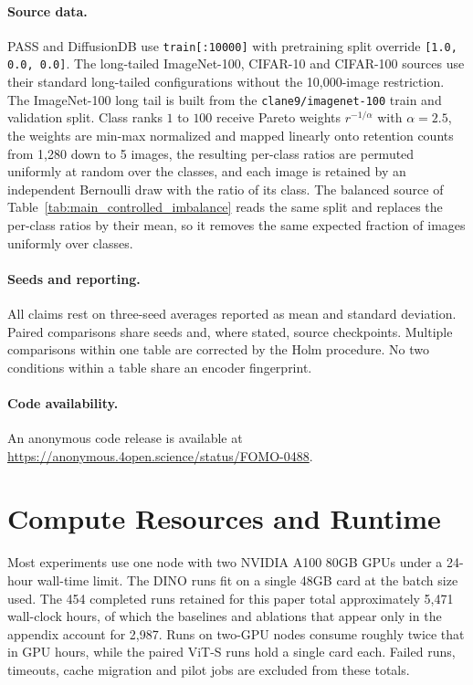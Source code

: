 \documentclass{article}
\begin{document}
\paragraph{Source data.}
PASS and DiffusionDB use \texttt{train[:10000]} with pretraining split override \texttt{[1.0, 0.0, 0.0]}. The long-tailed ImageNet-100, CIFAR-10 and CIFAR-100 sources use their standard long-tailed configurations without the 10{,}000-image restriction. The ImageNet-100 long tail is built from the \texttt{clane9/imagenet-100} train and validation split. Class ranks $1$ to $100$ receive Pareto weights $r^{-1/\alpha}$ with $\alpha=2.5$, the weights are min-max normalized and mapped linearly onto retention counts from 1{,}280 down to 5 images, the resulting per-class ratios are permuted uniformly at random over the classes, and each image is retained by an independent Bernoulli draw with the ratio of its class. The balanced source of Table~\ref{tab:main_controlled_imbalance} reads the same split and replaces the per-class ratios by their mean, so it removes the same expected fraction of images uniformly over classes.

\paragraph{Seeds and reporting.}
All claims rest on three-seed averages reported as mean and standard deviation. Paired comparisons share seeds and, where stated, source checkpoints. Multiple comparisons within one table are corrected by the Holm procedure. No two conditions within a table share an encoder fingerprint.

\paragraph{Code availability.}
An anonymous code release is available at \url{https://anonymous.4open.science/status/FOMO-0488}.

\section{Compute Resources and Runtime}
\label{app:compute}
Most experiments use one node with two NVIDIA A100 80GB GPUs under a 24-hour wall-time limit. The DINO runs fit on a single 48GB card at the batch size used. The 454 completed runs retained for this paper total approximately 5{,}471 wall-clock hours, of which the baselines and ablations that appear only in the appendix account for 2{,}987. Runs on two-GPU nodes consume roughly twice that in GPU hours, while the paired ViT-S runs hold a single card each. Failed runs, timeouts, cache migration and pilot jobs are excluded from these totals.
\end{document}
